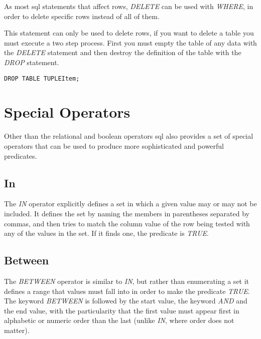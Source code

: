 As most \ac{sql} statements that affect rows, \emph{DELETE} can be used with \emph{WHERE}, in order to delete specific rows instead of all of them.

This statement can only be used to delete rows, if you want to delete a table you must execute a two step process. First you must empty the table of any data with the \emph{DELETE} statement and then destroy the definition of the table with the \emph{DROP} statement. 

\lstset{
  language=SQL, 
  caption=SQL drop statement, 
  label=lst:drop_item,
}

\begin{shaded}
\begin{lstlisting}
DROP TABLE TUPLEItem;
\end{lstlisting}  
\end{shaded}

\section{Special Operators}

Other than the relational and boolean operators \ac{sql} also provides a set of special operators that can be used to produce more sophisticated and powerful predicates. 

\subsection{In}
The \emph{IN} operator explicitly defines a set in which a given value may or may not be included. It defines the set by naming the members in parentheses separated by commas, and then tries to match the column value of the row being tested with any of the values in the set. If it finds one, the predicate is \emph{TRUE}.

\subsection{Between}

The \emph{BETWEEN} operator is similar to \emph{IN}, but rather than enumerating a set it defines a range that values must fall into in order to make the predicate \emph{TRUE}. The keyword \emph{BETWEEN} is followed by the start value, the keyword \emph{AND} and the end value, with the particularity that the first value must appear first in alphabetic or numeric order than the last (unlike \emph{IN}, where order does not matter).

